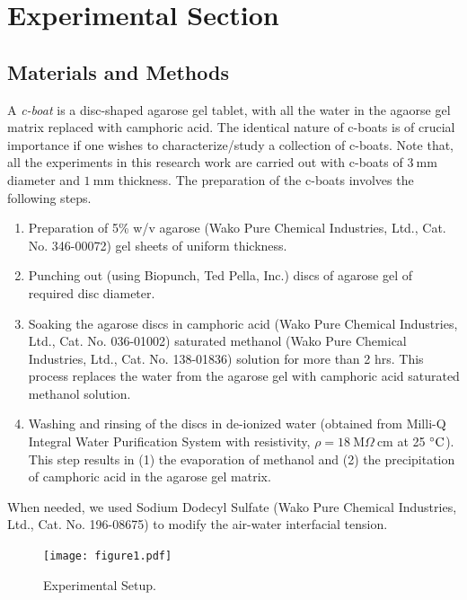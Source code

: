\documentclass[aps, twocolumn, floatfix, superscriptaddress]{revtex4}
\begin{document}
\section{Experimental Section}
\subsection{Materials and Methods}
\label{sec:prep}
A \emph{c-boat} is a disc-shaped agarose gel tablet, with all the water in the agaorse gel matrix replaced with camphoric acid. The identical nature of c-boats is of crucial importance if one wishes to characterize/study a collection of c-boats. Note that, all the experiments in this research work are carried out with c-boats of $3\ \mathrm{mm}$ diameter and $1\ \mathrm{mm}$ thickness. The preparation of the c-boats involves the following steps. 
\begin{enumerate}
\item Preparation of 5\% w/v agarose (Wako Pure Chemical Industries, Ltd., Cat. No. 346-00072) gel sheets of uniform thickness.
\item Punching out (using Biopunch, Ted Pella, Inc.) discs of agarose gel of required disc diameter. 
\item Soaking the agarose discs in camphoric acid (Wako Pure Chemical Industries, Ltd., Cat. No. 036-01002) saturated methanol (Wako Pure Chemical Industries, Ltd., Cat. No. 138-01836) solution for more than 2 hrs. This process replaces the water from the agarose gel with camphoric acid saturated methanol solution. 
\item Washing and rinsing of the discs in de-ionized water (obtained from Milli-Q Integral Water Purification System with resistivity, $\rho=\mathrm{18\ M} \Omega\ \mathrm{cm}$ at 25 $\celsius$). This step results in (1) the evaporation of methanol and (2) the precipitation of camphoric acid in the agarose gel matrix.
\end{enumerate}
When needed, we used Sodium Dodecyl Sulfate (Wako Pure Chemical Industries, Ltd., Cat. No. 196-08675) to modify the air-water interfacial tension.
\label{sec:expset}
\begin{figure}[ht]
    \begin{center}
       \texttt{[image: figure1.pdf]}
    \end{center}
    \caption{Experimental Setup.}
    \label{fig:expset}
\end{figure}
\end{document}
